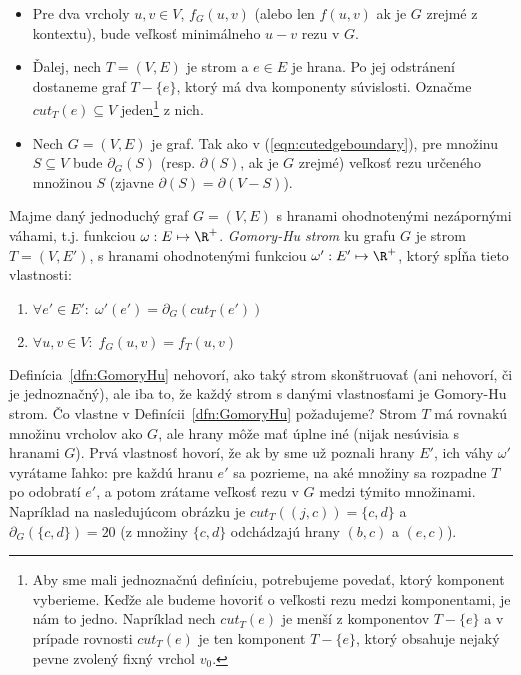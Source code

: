 \begin{itemize}
  \item Pre dva vrcholy $u,v\in V$, $f_G(u,v)$ (alebo
len $f(u,v)$ ak je $G$ zrejmé z kontextu), bude veľkosť minimálneho $u-v$ rezu v $G$. 
\item Ďalej,
nech $T=(V,E)$ je strom a $e\in E$ je hrana. Po jej odstránení dostaneme graf $T-\{e\}$, ktorý
má dva komponenty súvislosti. Označme $cut_T(e)\subseteq V$  
jeden\footnote{Aby sme mali jednoznačnú definíciu, potrebujeme povedať, ktorý komponent vyberieme.
  Keďže ale budeme hovoriť o veľkosti rezu medzi komponentami, 
  je nám to jedno. Napríklad nech $cut_T(e)$ je menší z komponentov $T-\{e\}$
  a v prípade rovnosti $cut_T(e)$ je 
ten komponent $T-\{e\}$, ktorý obsahuje nejaký pevne zvolený fixný vrchol $v_0$.}
z nich. 
\item Nech $G=(V,E)$ je graf. Tak ako v (\ref{eqn:cutedgeboundary}), 
  pre množinu $S\subseteq V$ bude $\partial_G(S)$ (resp. $\partial(S)$, ak je $G$ zrejmé)
veľkosť rezu určeného množinou $S$
(zjavne $\partial(S)=\partial(V-S)$).
\end{itemize}

\begin{framed}
  \begin{dfn}
    \label{dfn:GomoryHu}
    Majme daný jednoduchý graf $G=(V,E)$ s hranami ohodnotenými nezápornými váhami, t.j. funkciou
    $\omega:E\mapsto \R^+$. {\em Gomory-Hu strom} ku grafu $G$ je strom $T=(V,E')$, s hranami
    ohodnotenými funkciou  $\omega':E'\mapsto \R^+$, ktorý spĺňa tieto vlastnosti:
    \begin{enumerate}
      \item $\forall e'\in E':\;\omega'(e')=\partial_G(cut_T(e'))$
      \item $\forall u,v\in V:\;f_G(u,v)=f_T(u,v)$
    \end{enumerate}
  \end{dfn}
\end{framed}

Definícia~\ref{dfn:GomoryHu} nehovorí, ako taký strom skonštruovať (ani nehovorí, či je jednoznačný), ale iba
to, že každý strom s danými vlastnosťami je Gomory-Hu strom. Čo vlastne v Definícii~\ref{dfn:GomoryHu} požadujeme?
Strom $T$ má rovnakú množinu vrcholov ako $G$, ale hrany môže mať úplne iné (nijak nesúvisia s hranami $G$).
Prvá vlastnosť hovorí, že ak by sme už poznali hrany $E'$, ich váhy $\omega'$ vyrátame ľahko: pre každú
hranu $e'$ sa pozrieme, na aké množiny sa rozpadne $T$ po odobratí $e'$, a potom zrátame veľkosť
rezu v $G$ medzi týmito množinami. Napríklad na nasledujúcom obrázku je $cut_T((j,c))=\{c,d\}$
a $\partial_G(\{c,d\})=20$ (z množiny $\{c,d\}$ odchádzajú hrany $(b,c)$ a $(e,c)$).


